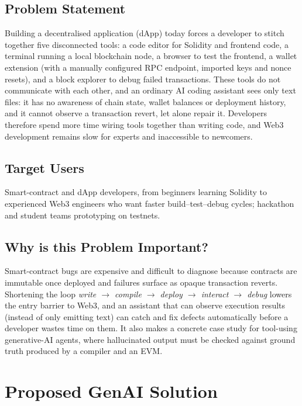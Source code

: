 \documentclass[11pt,letterpaper]{article}
\begin{document}
\subsection{Problem Statement}
Building a decentralised application (dApp) today forces a developer to stitch together five disconnected tools: a code editor for Solidity and frontend code, a terminal running a local blockchain node, a browser to test the frontend, a wallet extension (with a manually configured RPC endpoint, imported keys and nonce resets), and a block explorer to debug failed transactions. These tools do not communicate with each other, and an ordinary AI coding assistant sees only text files: it has no awareness of chain state, wallet balances or deployment history, and it cannot observe a transaction revert, let alone repair it. Developers therefore spend more time wiring tools together than writing code, and Web3 development remains slow for experts and inaccessible to newcomers.\cite{crucible}

\subsection{Target Users}
Smart-contract and dApp developers, from beginners learning Solidity to experienced Web3 engineers who want faster build--test--debug cycles; hackathon and student teams prototyping on testnets.

\subsection{Why is this Problem Important?}
Smart-contract bugs are expensive and difficult to diagnose because contracts are immutable once deployed and failures surface as opaque transaction reverts. Shortening the loop \emph{write $\rightarrow$ compile $\rightarrow$ deploy $\rightarrow$ interact $\rightarrow$ debug} lowers the entry barrier to Web3, and an assistant that can observe execution results (instead of only emitting text) can catch and fix defects automatically before a developer wastes time on them. It also makes a concrete case study for tool-using generative-AI agents, where hallucinated output must be checked against ground truth produced by a compiler and an EVM.

\section{Proposed GenAI Solution}
\end{document}
